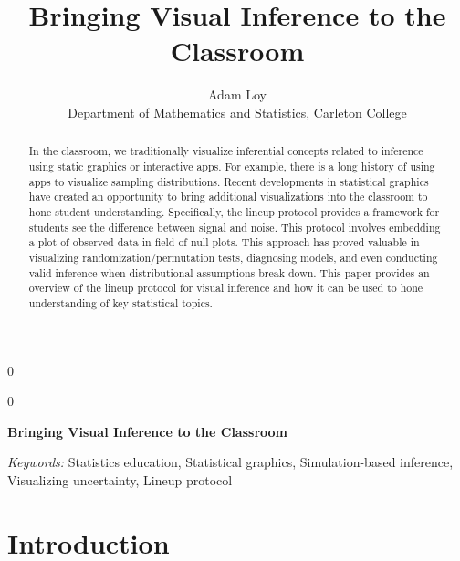\documentclass[12pt]{article}
\newcommand{\blind}{0}
\begin{document}
\def\spacingset#1{\renewcommand{\baselinestretch}%
{#1}\small\normalsize} \spacingset{1}



\blind
{
  \title{\bf Bringing Visual Inference to the Classroom}

  \author{
        Adam Loy \\
    Department of Mathematics and Statistics, Carleton College\\
      }
  \maketitle
} \fi

\blind
{
  \bigskip
  \bigskip
  \bigskip
  \begin{center}
    {\LARGE\bf Bringing Visual Inference to the Classroom}
  \end{center}
  \medskip
} \fi

\bigskip
\begin{abstract}
In the classroom, we traditionally visualize inferential concepts
related to inference using static graphics or interactive apps. For
example, there is a long history of using apps to visualize sampling
distributions. Recent developments in statistical graphics have created
an opportunity to bring additional visualizations into the classroom to
hone student understanding. Specifically, the lineup protocol
\citep{Buja-2009bd} provides a framework for students see the difference
between signal and noise. This protocol involves embedding a plot of
observed data in field of null plots. This approach has proved valuable
in visualizing randomization/permutation tests, diagnosing models, and
even conducting valid inference when distributional assumptions break
down. This paper provides an overview of the lineup protocol for visual
inference and how it can be used to hone understanding of key
statistical topics.
\end{abstract}

\noindent%
{\it Keywords:} Statistics education, Statistical graphics, Simulation-based inference, Visualizing uncertainty, Lineup protocol
\vfill

\newpage
\spacingset{1.45} %

\hypertarget{introduction}{%
\section{Introduction}\label{introduction}}
\end{document}
